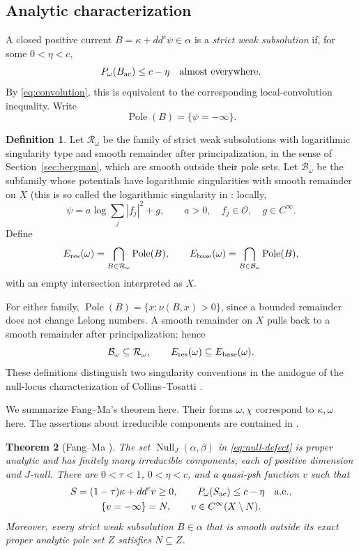 \documentclass[reqno]{amsart}
\numberwithin{equation}{section}
\newtheorem{theorem}{Theorem}[section]
\theoremstyle{definition}
\newtheorem{definition}[theorem]{Definition}
\DeclareMathOperator{\Null}{Null}
\DeclareMathOperator{\Pole}{Pole}
\newcommand{\ddc}{dd^c}
\newcommand{\cO}{\mathcal O}
\begin{document}
\subsection{Analytic characterization}

A closed positive current $B=\kappa+\ddc\psi\in\alpha$ is a
\emph{strict weak subsolution} if, for some $0<\eta<c$,
\begin{equation}\label{eq:null-strict}
 P_\omega(B_{\rm ac})\le c-\eta
 \quad\text{almost everywhere}.
\end{equation}
By \eqref{eq:convolution}, this is equivalent to the corresponding
local-convolution inequality. Write
\[
 \Pole(B)=\{\psi=-\infty\}.
\]

\begin{definition}\label{def:null-families}
Let $\mathcal R_\omega$ be the family of strict weak subsolutions
with logarithmic singularity type and smooth remainder after
principalization, in the sense of Section~\ref{sec:bergman}, which
are smooth outside their pole sets. Let $\mathcal B_\omega$ be
the subfamily whose potentials have logarithmic singularities with smooth remainder
on $X$ (this is so called the logarithmic singularity in \cite{CT15,L26a}: locally,
\[
 \psi=a\log\sum_j|f_j|^2+g,\qquad
 a>0,\quad f_j\in\cO,\quad g\in C^\infty.
\]
Define
\begin{equation}\label{eq:null-analytic-loci}
 E_{\rm res}(\omega)=\bigcap_{B\in\mathcal R_\omega}\Pole(B),
 \qquad
 E_{\rm base}(\omega)=\bigcap_{B\in\mathcal B_\omega}\Pole(B),
\end{equation}
with an empty intersection interpreted as $X$.
\end{definition}

For either family,
$\Pole(B)=\{x:\nu(B,x)>0\}$, since a bounded remainder does not
change Lelong numbers. A smooth remainder on $X$ pulls back to
a smooth remainder after principalization; hence
\[
 \mathcal B_\omega\subseteq\mathcal R_\omega,
 \qquad E_{\rm res}(\omega)\subseteq E_{\rm base}(\omega).
\]
These definitions distinguish two singularity conventions in the
analogue of the null-locus characterization of Collins--Tosatti
\cite{CT15}.

We summarize Fang--Ma's theorem here. Their forms $\omega,\chi$
correspond to $\kappa,\omega$ here. The assertions about
irreducible components are contained in
\cite[Proposition~5.2 and the proof of Theorem~5.1]{FM26}.

\begin{theorem}[{Fang--Ma \cite[Theorems~4.3 and~5.1]{FM26}}]
\label{thm:null-current}
The set $\Null_J(\alpha,\beta)$ in \eqref{eq:null-defect} is proper analytic and
has finitely many irreducible components, each of positive
dimension and $J$-null. There are $0<\tau<1$, $0<\eta<c$, and
a quasi-psh function $v$ such that
\[
 \begin{gathered}
 S=(1-\tau)\kappa+\ddc v\ge0,\qquad
 P_\omega(S_{\rm ac})\le c-\eta\quad\text{a.e.},\\
 \{v=-\infty\}=N,\qquad v\in C^\infty(X\setminus N).
 \end{gathered}
\]
Moreover, every strict weak subsolution $B\in\alpha$ that is
smooth outside its exact proper analytic pole set $Z$ satisfies
$N\subseteq Z$.
\end{theorem}
\end{document}
